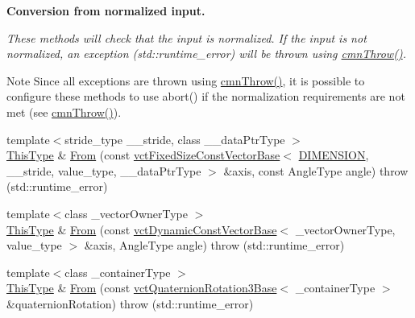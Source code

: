 \begin{Indent}{\bf Conversion from normalized input.}\par
{\em These methods will check that the input is normalized. If the input is not normalized, an exception ({\ttfamily std\+::runtime\+\_\+error}) will be thrown using \hyperlink{_minimal_cmn_8h_ad50e82cf9c9dbd0e6443c13e0d1a6f1a}{cmn\+Throw()}.

\begin{DoxyNote}{Note}
Since all exceptions are thrown using \hyperlink{_minimal_cmn_8h_ad50e82cf9c9dbd0e6443c13e0d1a6f1a}{cmn\+Throw()}, it is possible to configure these methods to use {\ttfamily abort()} if the normalization requirements are not met (see \hyperlink{_minimal_cmn_8h_ad50e82cf9c9dbd0e6443c13e0d1a6f1a}{cmn\+Throw()}). 
\end{DoxyNote}
}\begin{DoxyCompactItemize}
\item 
{\footnotesize template$<$stride\+\_\+type \+\_\+\+\_\+stride, class \+\_\+\+\_\+data\+Ptr\+Type $>$ }\\\hyperlink{classvct_axis_angle_rotation3_af654a8037b7b82a378f69cb1bfd9b8dd}{This\+Type} \& \hyperlink{classvct_axis_angle_rotation3_a296f32cc8359a9b986f1d15dd1834aa0}{From} (const \hyperlink{classvct_fixed_size_const_vector_base}{vct\+Fixed\+Size\+Const\+Vector\+Base}$<$ \hyperlink{group__cisst_vector_gga278b4a98a62e4f5ff42ce055836240a9a778d22dfe29402d2cfdd381c1b870285}{D\+I\+M\+E\+N\+S\+I\+O\+N}, \+\_\+\+\_\+stride, value\+\_\+type, \+\_\+\+\_\+data\+Ptr\+Type $>$ \&axis, const Angle\+Type angle)  throw (std\+::runtime\+\_\+error)
\item 
{\footnotesize template$<$class \+\_\+vector\+Owner\+Type $>$ }\\\hyperlink{classvct_axis_angle_rotation3_af654a8037b7b82a378f69cb1bfd9b8dd}{This\+Type} \& \hyperlink{classvct_axis_angle_rotation3_a2debd6ae28a69c331f79f464e00c057d}{From} (const \hyperlink{classvct_dynamic_const_vector_base}{vct\+Dynamic\+Const\+Vector\+Base}$<$ \+\_\+vector\+Owner\+Type, value\+\_\+type $>$ \&axis, Angle\+Type angle)  throw (std\+::runtime\+\_\+error)
\item 
{\footnotesize template$<$class \+\_\+container\+Type $>$ }\\\hyperlink{classvct_axis_angle_rotation3_af654a8037b7b82a378f69cb1bfd9b8dd}{This\+Type} \& \hyperlink{classvct_axis_angle_rotation3_ad9d0c6340e9597487d9c96d568ccdc8b}{From} (const \hyperlink{classvct_quaternion_rotation3_base}{vct\+Quaternion\+Rotation3\+Base}$<$ \+\_\+container\+Type $>$ \&quaternion\+Rotation)  throw (std\+::runtime\+\_\+error)

\end{DoxyCompactItemize}
\end{Indent}
